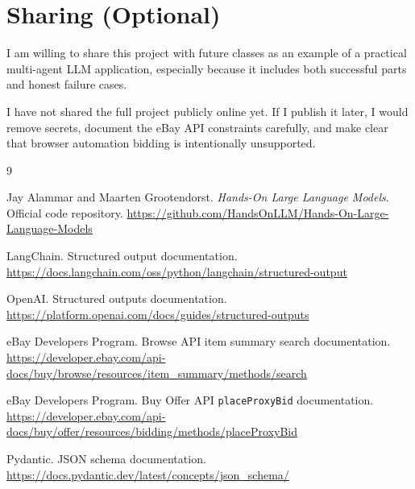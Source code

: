 \documentclass[10pt,twocolumn]{article}
\begin{document}
\section{Sharing (Optional)}

I am willing to share this project with future classes as an example of a practical multi-agent LLM application, especially because it includes both successful parts and honest failure cases.

I have not shared the full project publicly online yet. If I publish it later, I would remove secrets, document the eBay API constraints carefully, and make clear that browser automation bidding is intentionally unsupported.

\begin{thebibliography}{9}

Jay Alammar and Maarten Grootendorst.
\textit{Hands-On Large Language Models}. Official code repository.
\url{https://github.com/HandsOnLLM/Hands-On-Large-Language-Models}

LangChain.
Structured output documentation.
\url{https://docs.langchain.com/oss/python/langchain/structured-output}

OpenAI.
Structured outputs documentation.
\url{https://platform.openai.com/docs/guides/structured-outputs}

eBay Developers Program.
Browse API item summary search documentation.
\url{https://developer.ebay.com/api-docs/buy/browse/resources/item_summary/methods/search}

eBay Developers Program.
Buy Offer API \texttt{placeProxyBid} documentation.
\url{https://developer.ebay.com/api-docs/buy/offer/resources/bidding/methods/placeProxyBid}

Pydantic.
JSON schema documentation.
\url{https://docs.pydantic.dev/latest/concepts/json_schema/}

\end{thebibliography}
\end{document}
